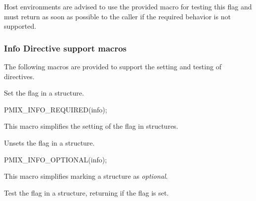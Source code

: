 \advicermstart
Host environments are advised to use the provided  macro for testing this flag and must return  as soon as possible to the caller if the required behavior is not supported.
\advicermend


\subsubsection{Info Directive support macros}

The following macros are provided to support the setting and testing of  directives.


Set the  flag in a  structure.

\cspecificstart
\begin{codepar}
PMIX_INFO_REQUIRED(info);
\end{codepar}
\cspecificend

\begin{arglist}
\end{arglist}

This macro simplifies the setting of the  flag in  structures.


Unsets the  flag in a  structure.

\cspecificstart
\begin{codepar}
PMIX_INFO_OPTIONAL(info);
\end{codepar}
\cspecificend

\begin{arglist}
\end{arglist}

This macro simplifies marking a  structure as \textit{optional}.


Test the  flag in a  structure, returning  if the flag is set.

